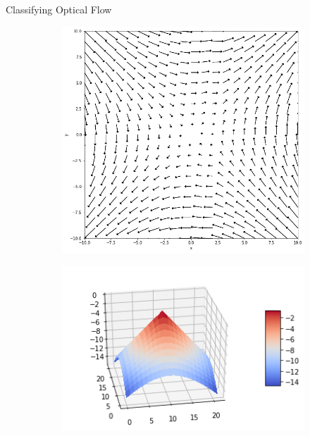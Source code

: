 \documentclass{beamer}
\begin{document}
\begin{frame}{Classifying Optical Flow}
\begin{figure}[]
\begin{subfigure}[b]{0.8\textwidth}
\begin{minipage}{.3\textwidth}
     		\end{minipage}%
                 \begin{minipage}{.3\textwidth}
     			\centering
     			\includegraphics[width=.8\linewidth]{images/saddle_phase.png}
     			
     		\end{minipage}
     	\end{subfigure}
     	

     	\begin{subfigure}[b]{0.8\textwidth}
     		
     		\begin{minipage}{.3\textwidth}
     			\centering
     			\includegraphics[width= 0.98\linewidth]{images/star.png}
     			

\end{minipage}
\end{subfigure}
\end{figure}
\end{frame}
\end{document}
